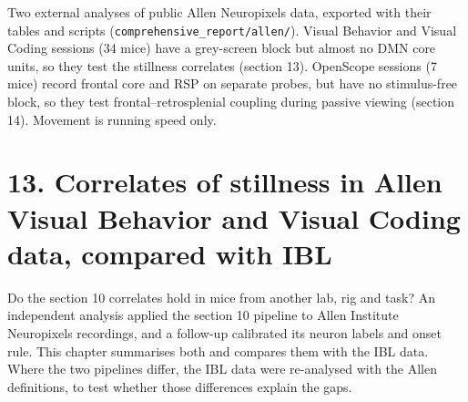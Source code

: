 \documentclass[10pt,a4paper]{article}
\begin{document}
Two external analyses of public Allen Neuropixels data, exported with their tables and scripts (\texttt{comprehensive\_\allowbreak{}report/\allowbreak{}allen/\allowbreak{}}). Visual Behavior and Visual Coding sessions (34 mice) have a grey-screen block but almost no DMN core units, so they test the stillness correlates (section 13). OpenScope sessions (7 mice) record frontal core and RSP on separate probes, but have no stimulus-free block, so they test frontal--retrosplenial coupling during passive viewing (section 14). Movement is running speed only.

\section{13. Correlates of stillness in Allen Visual Behavior and Visual Coding data, compared with IBL}
Do the section 10 correlates hold in mice from another lab, rig and task? An independent analysis applied the section 10 pipeline to Allen Institute Neuropixels recordings, and a follow-up calibrated its neuron labels and onset rule. This chapter summarises both and compares them with the IBL data. Where the two pipelines differ, the IBL data were re-analysed with the Allen definitions, to test whether those differences explain the gaps.
\end{document}
